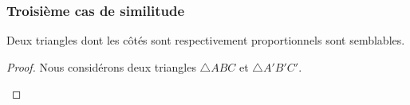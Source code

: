 \documentclass[a4paper,12pt]{article}
\begin{document}
\pagebreak
\subsubsection{Troisième cas de similitude}
\begin{theorem}
Deux triangles dont les côtés sont respectivement proportionnels sont semblables.
\end{theorem}



\begin{proof}
Nous considérons deux triangles $\triangle ABC$ et $\triangle A'B'C'$.

\begin{hyp}
\end{hyp}

\begin{concl}
\end{concl}




\end{proof}
\end{document}
